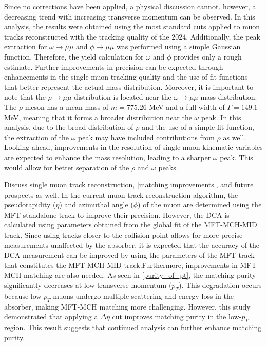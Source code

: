    Since no corrections have been applied, a physical discussion cannot. however, a decreasing trend with increasing transverse momentum can be observed.  
    In this analysis, the results were obtained using the most standard cuts applied to muon tracks reconstructed with the tracking quality of the 2024. Additionally, the peak extraction for \( \omega \rightarrow \mu\mu \) and \( \phi \rightarrow \mu\mu \) was performed using a simple Gaussian function. Therefore, the yield calculation for \( \omega \) and \( \phi \) provides only a rough estimate. Further improvements in precision can be expected through enhancements in the single muon tracking quality and the use of fit functions that better represent the actual mass distribution.  
    Moreover, it is important to note that the \( \rho \rightarrow \mu\mu \) distribution is located near the \( \omega \rightarrow \mu\mu \) mass distribution. The \( \rho \) meson has a mean mass of \( m = 775.26 \) MeV and a full width of \( \Gamma = 149.1 \) MeV, meaning that it forms a broader distribution near the \( \omega \) peak. In this analysis, due to the broad distribution of \( \rho \) and the use of a simple fit function, the extraction of the \( \omega \) peak may have included contributions from \( \rho \) as well. 
    Looking ahead, improvements in the resolution of single muon kinematic variables are expected to enhance the mass resolution, leading to a sharper \( \omega \) peak. This would allow for better separation of the \( \rho \) and \( \omega \) peaks.

    Discuss single muon track reconstruction, \ref{matching improvements}, and future prospects as well. In the current muon track reconstruction algorithm, the pseudorapidity (\(\eta\)) and azimuthal angle (\(\phi\)) of the muon are determined using the MFT standalone track to improve their precision. However, the DCA is calculated using parameters obtained from the global fit of the MFT-MCH-MID track. Since using tracks closer to the collision point allows for more precise measurements unaffected by the absorber, it is expected that the accuracy of the DCA measurement can be improved by using the parameters of the MFT track that constitutes the MFT-MCH-MID track.Furthermore, improvements in MFT-MCH matching are also needed. As seen in \ref{purity_of_pt}, the matching purity significantly decreases at low transverse momentum (\( p_T \)). This degradation occurs because low-\( p_T \) muons undergo multiple scattering and energy loss in the absorber, making MFT-MCH matching more challenging. However, this study demonstrated that applying a \( \Delta \eta \) cut improves matching purity in the low-\( p_T \) region. This result suggests that continued analysis can further enhance matching purity.

